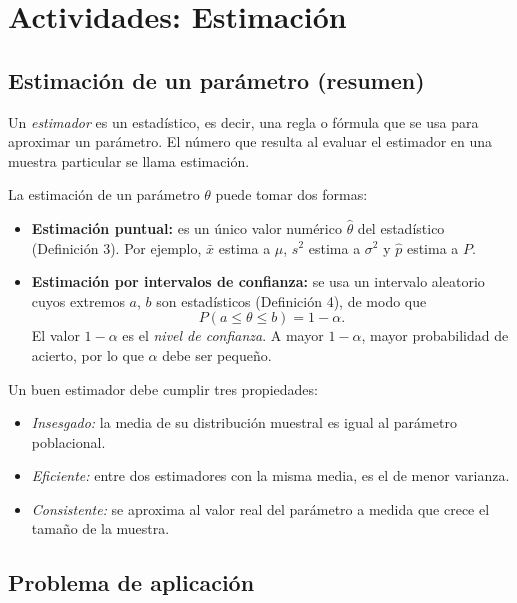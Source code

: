 \documentclass[10pt,letterpaper]{article}
\begin{document}


\section{Actividades: Estimación}

\subsection{Estimación de un parámetro (resumen)}

Un \textit{estimador} es un estadístico, es decir, una regla o fórmula que se usa para aproximar un parámetro. El número que resulta al evaluar el estimador en una muestra particular se llama estimación.

La estimación de un parámetro $\theta$ puede tomar dos formas:
\begin{itemize}
    \item \textbf{Estimación puntual:} es un único valor numérico $\hat{\theta}$ del estadístico (Definición 3). Por ejemplo, $\bar{x}$ estima a $\mu$, $s^2$ estima a $\sigma^2$ y $\hat{p}$ estima a $P$.
    \item \textbf{Estimación por intervalos de confianza:} se usa un intervalo aleatorio cuyos extremos $a$, $b$ son estadísticos (Definición 4), de modo que
    \[
        P(a \le \theta \le b) = 1-\alpha .
    \]
    El valor $1-\alpha$ es el \textit{nivel de confianza}. A mayor $1-\alpha$, mayor probabilidad de acierto, por lo que $\alpha$ debe ser pequeño.
\end{itemize}

Un buen estimador debe cumplir tres propiedades:
\begin{itemize}
    \item \textit{Insesgado:} la media de su distribución muestral es igual al parámetro poblacional.
    \item \textit{Eficiente:} entre dos estimadores con la misma media, es el de menor varianza.
    \item \textit{Consistente:} se aproxima al valor real del parámetro a medida que crece el tamaño de la muestra.
\end{itemize}

\subsection{Problema de aplicación}
\end{document}
